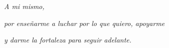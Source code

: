 \pagebreak


\begin{flushright} 
\textit{A mi mismo,}

\textit{por enseñarme a luchar por lo que quiero, apoyarme}


\textit{y darme la fortaleza para seguir adelante.}
\end{flushright}
\newpage
